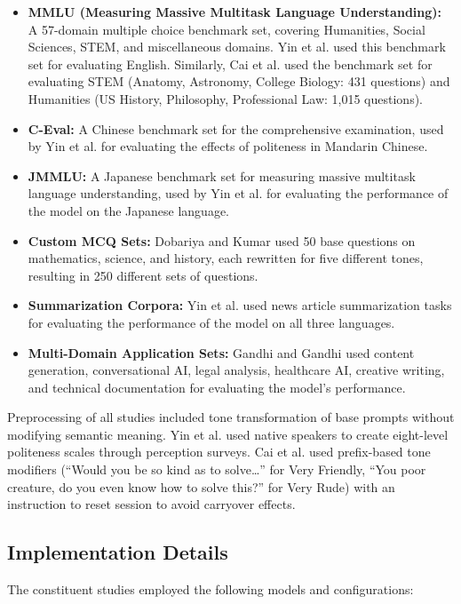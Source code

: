 \documentclass[conference]{IEEEtran}
\begin{document}
\begin{itemize}
\item \textbf{MMLU (Measuring Massive Multitask Language Understanding):} A 57-domain multiple choice benchmark set, covering Humanities, Social Sciences, STEM, and miscellaneous domains. Yin et al. \cite{b6} used this benchmark set for evaluating English. Similarly, Cai et al. \cite{b8} used the benchmark set for evaluating STEM (Anatomy, Astronomy, College Biology: 431 questions) and Humanities (US History, Philosophy, Professional Law: 1,015 questions).
\item \textbf{C-Eval:} A Chinese benchmark set for the comprehensive examination, used by Yin et al. \cite{b6} for evaluating the effects of politeness in Mandarin Chinese.
\item \textbf{JMMLU:} A Japanese benchmark set for measuring massive multitask language understanding, used by Yin et al. \cite{b6} for evaluating the performance of the model on the Japanese language.
\item \textbf{Custom MCQ Sets:} Dobariya and Kumar \cite{b7} used 50 base questions on mathematics, science, and history, each rewritten for five different tones, resulting in 250 different sets of questions.
\item \textbf{Summarization Corpora:} Yin et al. \cite{b6} used news article summarization tasks for evaluating the performance of the model on all three languages.
\item \textbf{Multi-Domain Application Sets:} Gandhi and Gandhi \cite{b10} used content generation, conversational AI, legal analysis, healthcare AI, creative writing, and technical documentation for evaluating the model's performance.
\end{itemize}

Preprocessing of all studies included tone transformation of base prompts without modifying semantic meaning. Yin et al. used native speakers to create eight-level politeness scales through perception surveys. Cai et al. used prefix-based tone modifiers (``Would you be so kind as to solve\ldots'' for Very Friendly, ``You poor creature, do you even know how to solve this?'' for Very Rude) with an instruction to reset session to avoid carryover effects.

\subsection{Implementation Details}

The constituent studies employed the following models and configurations:
\end{document}
